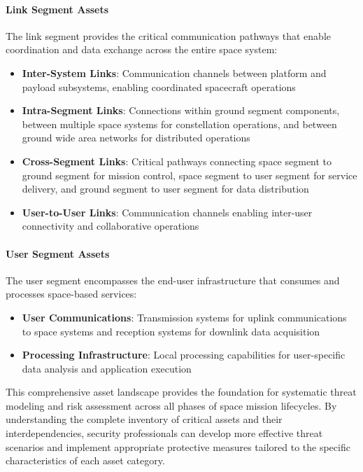 \documentclass[binding=0.6cm]{sapthesis}
\begin{document}
\paragraph{Link Segment Assets}

The link segment provides the critical communication pathways that enable coordination and data exchange across the entire space system:

\begin{itemize}
    \item \textbf{Inter-System Links}: Communication channels between platform and payload subsystems, enabling coordinated spacecraft operations
    \item \textbf{Intra-Segment Links}: Connections within ground segment components, between multiple space systems for constellation operations, and between ground wide area networks for distributed operations
    \item \textbf{Cross-Segment Links}: Critical pathways connecting space segment to ground segment for mission control, space segment to user segment for service delivery, and ground segment to user segment for data distribution
    \item \textbf{User-to-User Links}: Communication channels enabling inter-user connectivity and collaborative operations
\end{itemize}

\paragraph{User Segment Assets}

The user segment encompasses the end-user infrastructure that consumes and processes space-based services:

\begin{itemize}
    \item \textbf{User Communications}: Transmission systems for uplink communications to space systems and reception systems for downlink data acquisition
    \item \textbf{Processing Infrastructure}: Local processing capabilities for user-specific data analysis and application execution
\end{itemize}

This comprehensive asset landscape provides the foundation for systematic threat modeling and risk assessment across all phases of space mission lifecycles. By understanding the complete inventory of critical assets and their interdependencies, security professionals can develop more effective threat scenarios and implement appropriate protective measures tailored to the specific characteristics of each asset category.
\end{document}
